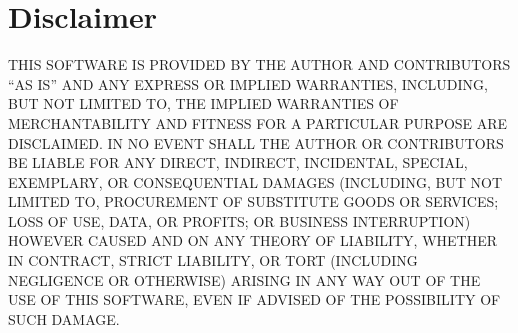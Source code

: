 \documentclass[12pt]{article}
\begin{document}
\section{Disclaimer}
\label{disclaim}

THIS SOFTWARE IS PROVIDED BY THE AUTHOR AND CONTRIBUTORS ``AS IS'' AND
ANY EXPRESS OR IMPLIED WARRANTIES, INCLUDING, BUT NOT LIMITED TO, THE
IMPLIED WARRANTIES OF MERCHANTABILITY AND FITNESS FOR A PARTICULAR PURPOSE
ARE DISCLAIMED.  IN NO EVENT SHALL THE AUTHOR OR CONTRIBUTORS BE LIABLE
FOR ANY DIRECT, INDIRECT, INCIDENTAL, SPECIAL, EXEMPLARY, OR CONSEQUENTIAL
DAMAGES (INCLUDING, BUT NOT LIMITED TO, PROCUREMENT OF SUBSTITUTE GOODS
OR SERVICES; LOSS OF USE, DATA, OR PROFITS; OR BUSINESS INTERRUPTION)
HOWEVER CAUSED AND ON ANY THEORY OF LIABILITY, WHETHER IN CONTRACT, STRICT
LIABILITY, OR TORT (INCLUDING NEGLIGENCE OR OTHERWISE) ARISING IN ANY WAY
OUT OF THE USE OF THIS SOFTWARE, EVEN IF ADVISED OF THE POSSIBILITY OF
SUCH DAMAGE.

\newpage
\printindex
\end{document}
